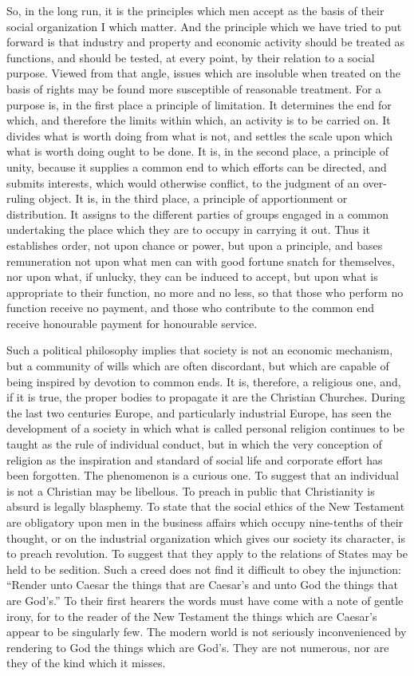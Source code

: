 \documentclass{book}
\begin{document}
So, in the long run, it is the principles which men accept as the basis of their social organization I which matter. And the principle which we have tried to put forward is that industry and property and economic activity should be treated as functions, and should be tested, at every point, by their relation to a social purpose. Viewed from that angle, issues which are insoluble when treated on the basis of rights may be found more susceptible of reasonable treatment. For a purpose is, in the first place a principle of limitation. It determines the end for which, and therefore the limits within which, an activity is to be carried on. It divides what is worth doing from what is not, and settles the scale upon which what is worth doing ought to be done. It is, in the second place, a principle of unity, because it supplies a common end to which efforts can be directed, and submits interests, which would otherwise conflict, to the judgment of an over-ruling object. It is, in the third place, a principle of apportionment or distribution. It assigns to the different parties of groups engaged in a common undertaking the place which they are to occupy in carrying it out. Thus it establishes order, not upon chance or power, but upon a principle, and bases remuneration not upon what men can with good fortune snatch for themselves, nor upon what, if unlucky, they can be induced to accept, but upon what is appropriate to their function, no more and no less, so that those who perform no function receive no payment, and those who contribute to the common end receive honourable payment for honourable service.

Such a political philosophy implies that society is not an economic mechanism, but a community of wills which are often discordant, but which are capable of being inspired by devotion to common ends. It is, therefore, a religious one, and, if it is true, the proper bodies to propagate it are the Christian Churches. During the last two centuries Europe, and particularly industrial Europe, has seen the development of a society in which what is called personal religion continues to be taught as the rule of individual conduct, but in which the very conception of religion as the inspiration and standard of social life and corporate effort has been forgotten. The phenomenon is a curious one. To suggest that an individual is not a Christian may be libellous. To preach in public that Christianity is absurd is legally blasphemy. To state that the social ethics of the New Testament are obligatory upon men in the business affairs which occupy nine-tenths of their thought, or on the industrial organization which gives our society its character, is to preach revolution. To suggest that they apply to the relations of States may be held to be sedition. Such a creed does not find it difficult to obey the injunction: “Render unto Caesar the things that are Caesar’s and unto God the things that are God’s.” To their first hearers the words must have come with a note of gentle irony, for to the reader of the New Testament the things which are Caesar’s appear to be singularly few. The modern world is not seriously inconvenienced by rendering to God the things which are God’s. They are not numerous, nor are they of the kind which it misses.
\end{document}
